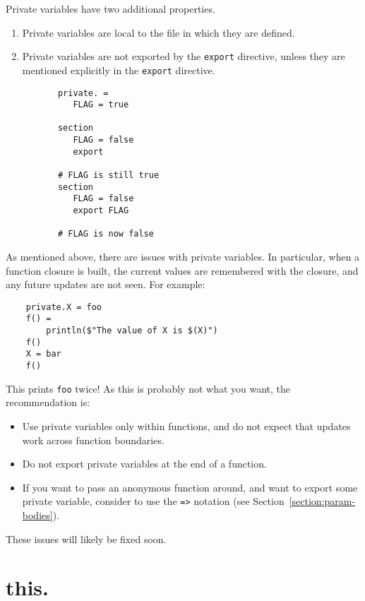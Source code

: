 Private variables have two additional properties.

\begin{enumerate}
\item Private variables are local to the file in which they are defined.
\item Private variables are not exported by the \verb+export+ directive, unless they are
  mentioned explicitly in the \verb+export+ directive.

  \begin{verbatim}
       private. =
          FLAG = true

       section
          FLAG = false
          export

       # FLAG is still true
       section
          FLAG = false
          export FLAG

       # FLAG is now false
  \end{verbatim}
\end{enumerate}

As mentioned above, there are issues with private variables. In particular,
when a function closure is built, the current values are remembered with the
closure, and any future updates are not seen. For example:

\begin{verbatim}
    private.X = foo
    f() =
        println($"The value of X is $(X)")
    f()
    X = bar
    f()
\end{verbatim}

This prints \verb+foo+ twice! As this is probably not what you want, the
recommendation is: 

\begin{itemize}
\item Use private variables only within functions, and do not expect that
  updates work across function boundaries.
\item Do not export private variables at the end of a function.
\item If you want to pass an anonymous function around, and want to
  export some private variable, consider to use
  the \verb+=>+ notation (see Section~\ref{section:param-bodies}).
\end{itemize}

These issues will likely be fixed soon.


\section{this.}

